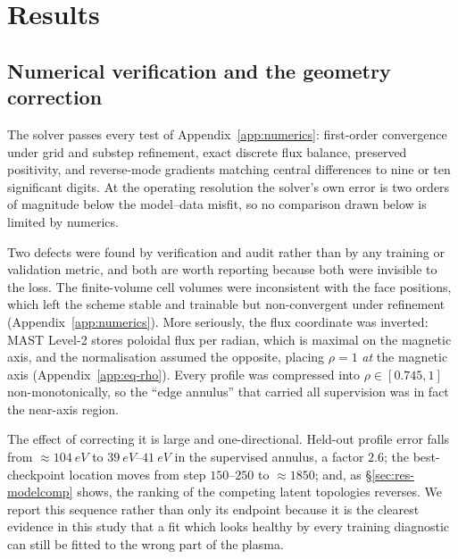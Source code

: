 
\section{Results}
\label{sec:results}

\subsection{Numerical verification and the geometry correction}
\label{sec:res-verif}

The solver passes every test of Appendix~\ref{app:numerics}: first-order
convergence under grid and substep refinement, exact discrete flux balance,
preserved positivity, and reverse-mode gradients matching central
differences to nine or ten significant digits. At the operating resolution
the solver's own error is two orders of magnitude below the model--data
misfit, so no comparison drawn below is limited by numerics.

Two defects were found by verification and audit rather than by any training
or validation metric, and both are worth reporting because both were
invisible to the loss. The finite-volume cell volumes were inconsistent with
the face positions, which left the scheme stable and trainable but
non-convergent under refinement (Appendix~\ref{app:numerics}). More
seriously, the flux coordinate was inverted: MAST Level-2 stores poloidal
flux per radian, which is maximal on the magnetic axis, and the
normalisation assumed the opposite, placing $\rho = 1$ \emph{at} the
magnetic axis (Appendix~\ref{app:eq-rho}). Every profile was compressed into
$\rho \in [0.745, 1]$ non-monotonically, so the ``edge annulus'' that
carried all supervision was in fact the near-axis region.

The effect of correcting it is large and one-directional. Held-out profile
error falls from $\approx \SI{104}{eV}$ to $\SI{39}{eV}$--$\SI{41}{eV}$ in
the supervised annulus, a factor $2.6$; the best-checkpoint location moves
from step $150$--$250$ to $\approx 1850$; and, as \S\ref{sec:res-modelcomp}
shows, the ranking of the competing latent topologies reverses. We report
this sequence rather than only its endpoint because it is the clearest
evidence in this study that a fit which looks healthy by every training
diagnostic can still be fitted to the wrong part of the plasma.

